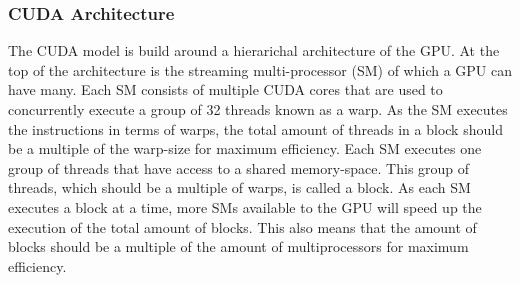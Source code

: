 \subsubsection{CUDA Architecture}
The CUDA model is build around a hierarichal architecture of the GPU. 
At the top of the architecture is the streaming multi-processor (SM) of which a GPU can have many. 
Each SM consists of multiple CUDA cores that are used to concurrently execute a group of 32 threads known as a warp. As the SM executes the instructions in terms of warps, the total amount of threads in a block should be a multiple of the warp-size for maximum efficiency.
Each SM executes one group of threads that have access to a shared memory-space. This group of threads, which should be a multiple of warps, is called a block. 
As each SM executes a block at a time, more SMs available to the GPU will speed up the execution of the total amount of blocks. 
This also means that the amount of blocks should be a multiple of the amount of multiprocessors for maximum efficiency. %

